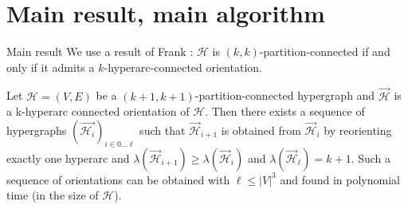 \documentclass[10pt, aspectratio=43,compress]{beamer}
\begin{document}
	\section{Main result, main algorithm}
	\begin{frame}{Main result}
		We use a result of Frank : $\mathcal{H}$ is $(k, k)$-partition-connected if and only if it admits a $k$-hyperarc-connected orientation.

		\begin{tcolorbox}[colback=richcarmine!5!white,colframe=richcarmine!75!black,title=Main result (Theorem 7)]
			Let $\mathcal{H} = (V, E)$ be a $(k+1, k+1)$-partition-connected hypergraph and $\vec{\mathcal{H}}$ is a k-hyperarc connected orientation of $\mathcal{H}$. Then there exists a sequence of hypergraphs $(\vec{\mathcal{H}_{i}})_{i\in0\dots\ell}$ such that $\vec{\mathcal{H}}_{i+1}$ is obtained from $\vec{\mathcal{H}}_{i}$ by reorienting exactly one hyperarc and $\lambda(\vec{\mathcal{H}}_{i+1}) \geq \lambda(\vec{\mathcal{H}}_{i})$ and $\lambda(\vec{\mathcal{H}}_{\ell}) = k + 1$. Such a sequence of orientations can be obtained with $\ell \leq |V|^{3}$ and found in polynomial time (in the size of $\mathcal{H}$).
		\end{tcolorbox}
	\end{frame}
	
\end{document}
